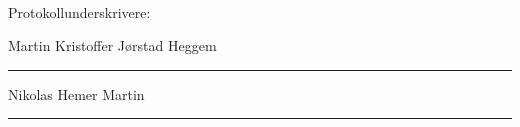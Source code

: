 \documentclass[10pt,norsk,a4paper,usenames,dvipsnames]{article}
\begin{document}
\mbox{}
\\[24pt]

\begin{center}
\LARGE Protokollunderskrivere:\\[30pt]

\begin{multicols}{2}
    \Large
    Martin Kristoffer Jørstad Heggem\\[48pt]
    \rule{220pt}{1pt}

    Nikolas Hemer Martin\\[48pt]
    \rule{220pt}{1pt}


\end{multicols}
\end{center}



% 
\end{document}
